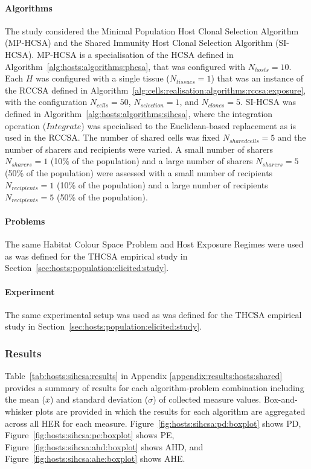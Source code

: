 %
%
\paragraph{Algorithms}
The study considered the Minimal Population Host Clonal Selection Algorithm (MP-HCSA) and the Shared Immunity Host Clonal Selection Algorithm (SI-HCSA).
MP-HCSA is a specialisation of the HCSA defined in Algorithm~\ref{alg:hosts:algorithms:phcsa}, that was configured with $N_{hosts}=10$. Each $H$ was configured with a single tissue ($N_{tissues}=1$) that was an instance of the RCCSA defined in Algorithm~\ref{alg:cells:realisation:algorithms:rccsa:exposure}, with the configuration $N_{cells}=50$, $N_{selection}=1$, and $N_{clones}=5$.
SI-HCSA was defined in Algorithm~\ref{alg:hosts:algorithms:sihcsa}, where the integration operation ($Integrate$) was specialised to the Euclidean-based replacement as is used in the RCCSA. The number of shared cells was fixed $N_{sharedcells}=5$ and the number of sharers and recipients were varied. A small number of sharers $N_{sharers}=1$ (10\% of the population) and a large number of sharers $N_{sharers}=5$ (50\% of the population) were assessed with a small number of recipients $N_{recipients}=1$ (10\% of the population) and a large number of recipients $N_{recipients}=5$ (50\% of the population). 

%
%
\paragraph{Problems}
The same Habitat Colour Space Problem and Host Exposure Regimes were used as was defined for the THCSA empirical study in Section~\ref{sec:hosts:population:elicited:study}.

%
%
\paragraph{Experiment}
The same experimental setup was used as was defined for the THCSA empirical study in Section~\ref{sec:hosts:population:elicited:study}.

%
%
\subsubsection{Results}
Table~\ref{tab:hosts:sihcsa:results} in Appendix \ref{appendix:results:hosts:shared} provides a summary of results for each algorithm-problem combination including the mean ($\bar{x}$) and standard deviation ($\sigma$) of collected measure values.  Box-and-whisker plots are provided in which the results for each algorithm are aggregated across all HER for each measure. Figure~\ref{fig:hosts:sihcsa:pd:boxplot} shows PD, Figure~\ref{fig:hosts:sihcsa:pe:boxplot} shows PE, Figure~\ref{fig:hosts:sihcsa:ahd:boxplot} shows AHD, and Figure~\ref{fig:hosts:sihcsa:ahe:boxplot} shows AHE.

